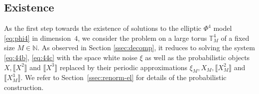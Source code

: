 \documentclass[a4paper,11pt]{article}
\numberwithin{equation}{section}
\newcommand{\N}{\mathbb{N}}
\newcommand{\8}{\infty}
\begin{document}
\subsection{Existence}
\label{ssec:ex44}


As the first step towards the  existence of solutions to the elliptic $\Phi^{4}$ model \eqref{eq:phi4} in dimension~$4$, we consider the problem on a large torus $\mathbb{T}_{M}^{4}$ of a fixed size $M\in\N$. As observed in Section \ref{ssec:decomp}, it reduces to solving the system \eqref{eq:44b}, \eqref{eq:44c} with the space white noise $\xi$ as well as the probabilistic objects $X,\llbracket X^{2}\rrbracket$ and $\llbracket X^{3}\rrbracket$ replaced by their periodic approximations $\xi_{M},X_{M},\llbracket X_{M}^{2}\rrbracket$ and $\llbracket X_{M}^{3}\rrbracket$. We refer to Section~\ref{ssec:renorm-el} for details of the probabilistic construction.
\end{document}
